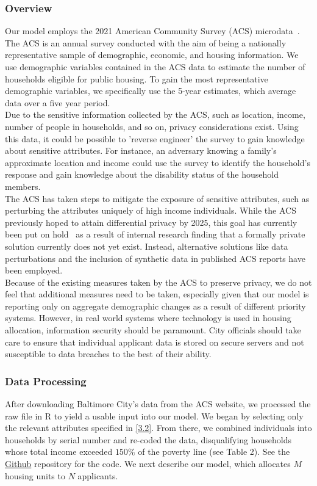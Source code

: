 \documentclass[11pt]{article}
\begin{document}
\subsubsection{Overview}Our model employs the 2021 American Community Survey (ACS) microdata~\cite{us_census_bureau_mdat_nodate}. The ACS is an annual survey conducted with the aim of being a nationally representative sample of demographic, economic, and housing information. We use demographic variables contained in the ACS data to estimate the number of households eligible for public housing. To gain the most representative demographic variables, we specifically use the 5-year estimates, which average data over a five year period. \\
\newline
Due to the sensitive information collected by the ACS, such as location, income, number of people in households, and so on, privacy considerations exist. Using this data, it could be possible to 'reverse engineer' the survey to gain knowledge about sensitive attributes. For instance, an adversary knowing a family's approximate location and income could use the survey to identify the household's response and gain knowledge about the disability status of the household members. \\
\newline
The ACS has taken steps to mitigate the exposure of sensitive attributes, such as perturbing the attributes uniquely of high income individuals. While the ACS previously hoped to attain differential privacy by 2025, this goal has currently been put on hold~\cite{donna_daily_disclosure_nodate} as a result of internal research finding that a formally private solution currently does not yet exist. Instead, alternative solutions like data perturbations and the inclusion of synthetic data in published ACS reports have been employed. \\
\newline
Because of the existing measures taken by the ACS to preserve privacy, we do not feel that additional measures need to be taken, especially given that our model is reporting only on aggregate demographic changes as a result of different priority systems. However, in real world systems where technology is used in housing allocation, information security should be paramount. City officials should take care to ensure that individual applicant data is stored on secure servers and not susceptible to data breaches to the best of their ability. 
\subsubsection{Data Processing}
After downloading Baltimore City's data from the ACS website, we processed the raw file in R to yield a usable input into our model.  We began by selecting only the relevant attributes specified in \autoref{3.2}. From there, we combined individuals into households by serial number and re-coded the data, disqualifying households whose total income exceeded $150\%$ of the poverty line (see Table 2). See the \href{https://github.com/atulpokh/cpsc464final/tree/main}{Github} repository for the code.
We next describe our model, which allocates $M$ housing units to $N$ applicants. 
\end{document}
